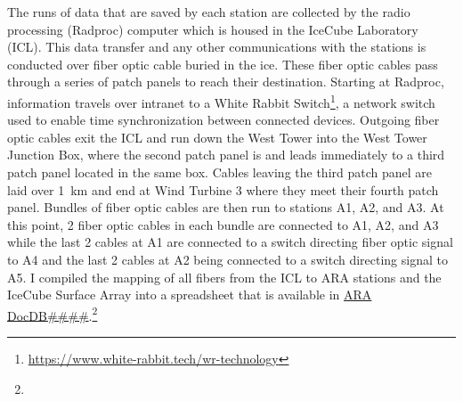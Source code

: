        The runs of data that are saved by each station are collected by the radio processing (Radproc) computer which is housed in the IceCube Laboratory (ICL). 
        This data transfer and any other communications with the stations is conducted over fiber optic cable buried in the ice. 
        These fiber optic cables pass through a series of patch panels to reach their destination. 
        Starting at Radproc, information travels over intranet to a White Rabbit Switch\footnote{\url{https://www.white-rabbit.tech/wr-technology}}, a network switch used to enable time synchronization between connected devices. 
        Outgoing fiber optic cables exit the ICL and run down the West Tower into the West Tower Junction Box, where the second patch panel is and leads immediately to a third patch panel located in the same box. 
        Cables leaving the third patch panel are laid over 1~km and end at Wind Turbine 3 where they meet their fourth patch panel. 
        Bundles of fiber optic cables are then run to stations A1, A2, and A3. 
        At this point, 2 fiber optic cables in each bundle are connected to A1, A2, and A3 while the last 2 cables at A1 are connected to a switch directing fiber optic signal to A4 and the last 2 cables at A2 being connected to a switch directing signal to A5. 
        I compiled the mapping of all fibers from the ICL to ARA stations and the IceCube Surface Array into a spreadsheet that is available in \href{https://aradocs.wipac.wisc.edu/DocDB/DocumentDatabase}{ARA DocDB\#\#\#\#}.\footnote{}


